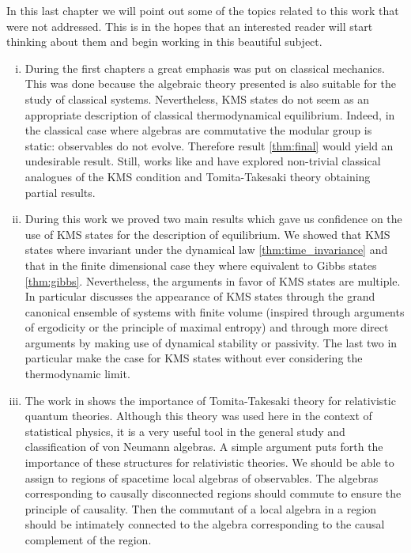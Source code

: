 In this last chapter we will point out some of the topics related to this work that were not addressed. This is in the hopes that an interested reader will start thinking about them and begin working in this beautiful subject.

\begin{enumerate}[(i)]

\item During the first chapters a great emphasis was put on classical mechanics. This was done because the algebraic theory presented is also suitable for the study of classical systems. Nevertheless, KMS states do not seem as an appropriate description of classical thermodynamical equilibrium. Indeed, in the classical case where algebras are commutative the modular group is static: observables do not evolve. Therefore result \ref{thm:final} would yield an undesirable result. Still, works like \cite{Aizenman1977} and \cite{Gallavotti1976} have explored non-trivial classical analogues of the KMS condition and Tomita-Takesaki theory obtaining partial results.

\item During this work we proved two main results which gave us confidence on the use of KMS states for the description of equilibrium. We showed that KMS states where invariant under the dynamical law \ref{thm:time_invariance} and that in the finite dimensional case they where equivalent to Gibbs states \ref{thm:gibbs}. Nevertheless, the arguments in favor of KMS states are multiple. In particular \cite{Haag1996} discusses the appearance of KMS states through the grand canonical ensemble of systems with finite volume (inspired through arguments of ergodicity or the principle of maximal entropy) and through more direct arguments by making use of dynamical stability or passivity. The last two in particular make the case for KMS states without ever considering the thermodynamic limit.

\item The work in \cite{Haag1996} shows the importance of Tomita-Takesaki theory for relativistic quantum theories. Although this theory was used here in the context of statistical physics, it is a very useful tool in the general study and classification of von Neumann algebras. A simple argument puts forth the importance of these structures for relativistic theories. We should be able to assign to regions of spacetime local algebras of observables. The algebras corresponding to causally disconnected regions should commute to ensure the principle of causality. Then the commutant of a local algebra in a region should be intimately connected to the algebra corresponding to the causal complement of the region. 


\end{enumerate}

